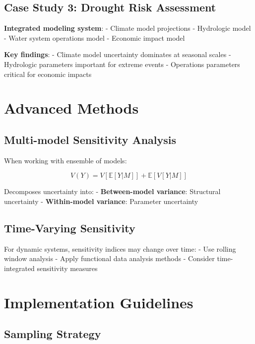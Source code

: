 \documentclass[
  letterpaper,
  DIV=11,
  numbers=noendperiod]{scrreprt}
\begin{document}
\subsection{Case Study 3: Drought Risk
Assessment}\label{case-study-3-drought-risk-assessment}

\textbf{Integrated modeling system}: - Climate model projections -
Hydrologic model - Water system operations model - Economic impact model

\textbf{Key findings}: - Climate model uncertainty dominates at seasonal
scales - Hydrologic parameters important for extreme events - Operations
parameters critical for economic impacts

\section{Advanced Methods}\label{advanced-methods}

\subsection{Multi-model Sensitivity
Analysis}\label{multi-model-sensitivity-analysis}

When working with ensemble of models:

\[
V(Y) = V[\mathbb{E}[Y|M]] + \mathbb{E}[V[Y|M]]
\]

Decomposes uncertainty into: - \textbf{Between-model variance}:
Structural uncertainty - \textbf{Within-model variance}: Parameter
uncertainty

\subsection{Time-Varying Sensitivity}\label{time-varying-sensitivity}

For dynamic systems, sensitivity indices may change over time: - Use
rolling window analysis - Apply functional data analysis methods -
Consider time-integrated sensitivity measures

\section{Implementation Guidelines}\label{implementation-guidelines}

\subsection{Sampling Strategy}\label{sampling-strategy}
\end{document}
